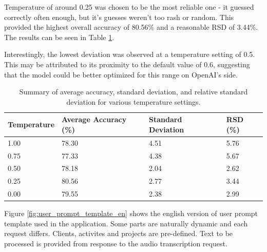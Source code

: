 \documentclass[
  digital,     %
  oneside,     %
  nosansbold,  %
  nocolorbold, %
  lof,         %
  lot,         %
]{fithesis4}
\begin{document}
Temperature of around 0.25 was chosen to be the most reliable one - it guessed correctly often enough, but it's guesses weren't too rash or random. This provided the highest overall accuracy of 80.56\% and a reasonable RSD of 3.44\%. The results can be seen in Table \ref{tab:temperature_summary}.

Interestingly, the lowest deviation was observed at a temperature setting of 0.5. This may be attributed to its proximity to the default value of 0.6, suggesting that the model could be better optimized for this range on OpenAI's side.

\begin{table}[H]
  \centering
  \begin{tabularx}{\textwidth}{lXXX}
    \toprule
    \textbf{Temperature} & \textbf{Average Accuracy (\%)} & \textbf{Standard Deviation} & \textbf{RSD (\%)} \\
    \midrule
    1.00  & 78.30 & 4.51 & 5.76 \\
    0.75  & 77.33 & 4.38 & 5.67 \\
    0.50  & 78.18 & 2.04 & 2.62 \\
    0.25  & 80.56 & 2.77 & 3.44 \\
    0.00  & 79.55 & 2.38 & 2.99 \\
    \bottomrule
  \end{tabularx}
  \caption{Summary of average accuracy, standard deviation, and relative standard deviation for various temperature settings.}
  \label{tab:temperature_summary}
\end{table}

Figure \ref{fig:user_prompt_template_en} shows the english version of user prompt template used in the application. Some parts are naturally dynamic and each request differs. Clients, activites and projects are pre-defined. Text to be processed is provided from response to the audio transcription request.
\end{document}
